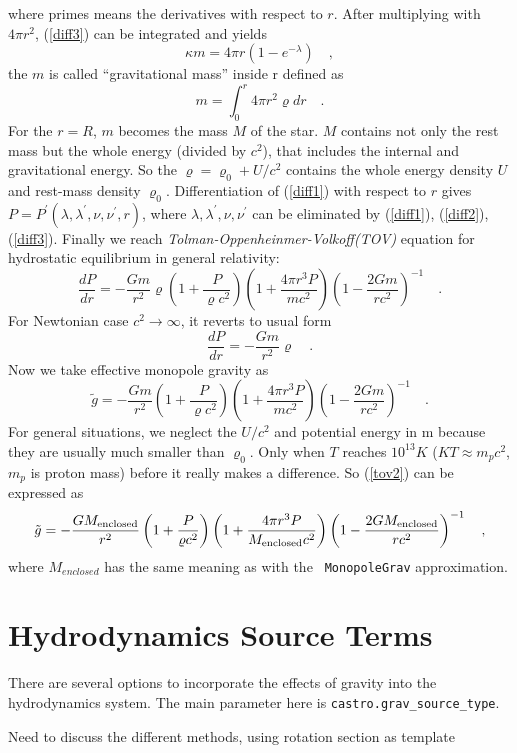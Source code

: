 where primes means the derivatives with respect to $r$. After
multiplying with $4\pi r^2$, (\ref{diff3}) can be integrated and
yields
\begin{equation}\label{gmass1}
  \kappa m = 4\pi r (1-e^{-\lambda}) \quad ,
\end{equation}
the $m$ is called ``gravitational mass'' inside r defined as
\begin{equation}\label{gmass2}
  m = \int_{0}^{r}4\pi r^{2}  \varrho dr\quad .
\end{equation}
For the $r = R$, $m$ becomes the mass $M$ of the star. $M$ contains
not only the rest mass but the whole energy (divided by $c^2$), that
includes the internal and gravitational energy. So the $\varrho =
\varrho_0 +U/c^2$ contains the whole energy density $U$ and rest-mass
density $\varrho_0$.  Differentiation of (\ref{diff1}) with respect to
$r$ gives $P = P^{\prime}(\lambda,\lambda^{\prime},
\nu,\nu^{\prime},r)$, where
$\lambda,\lambda^{\prime},\nu,\nu^{\prime}$ can be eliminated by
(\ref{diff1}), (\ref{diff2}), (\ref{diff3}). Finally we reach
\textit{Tolman-Oppenheinmer-Volkoff(TOV)} equation for hydrostatic
equilibrium in general relativity:
\begin{equation}\label{tov}
  \frac{dP}{dr} = -\frac{Gm}{r^{2}}\varrho \left (1+\frac{P}{\varrho
    c^{2}}\right )\left (1+\frac{4\pi r^3 P}{m c^{2}}\right ) \left (1-\frac{2Gm}{r c^{2}} \right)^{-1} \quad .
\end{equation}
For Newtonian case $c^2 \rightarrow  \infty $, it reverts to usual form
\begin{equation}\label{newton}
  \frac{dP}{dr} = -\frac{Gm}{r^{2}}\varrho \quad .
\end{equation}
Now we take effective monopole gravity as
\begin{equation}\label{tov2}
\tilde{g} = -\frac{Gm}{r^{2}} (1+\frac{P}{\varrho
  c^{2}})(1+\frac{4\pi r^3 P}{m c^{2}}) (1-\frac{2Gm}{r c^{2}})^{-1}  \quad .
\end{equation}
For general situations, we neglect the $U/c^2$ and potential energy in
m because they are usually much smaller than $\varrho_0$. Only when
$T$ reaches $10^{13} K$ ($KT \approx m_{p} c^2$, $m_p$ is proton mass)
before it really makes a difference. So (\ref{tov2}) can be expressed
as
\begin{equation}\label{tov3}
  \tilde{g} = -\frac{GM_{\rm enclosed}}{r^{2}} \left (1+\frac{P}{\varrho
    c^{2}} \right )\left (1+\frac{4\pi r^3 P}{M_{\rm enclosed} c^{2}} \right ) \left (1-\frac{2GM_{\rm enclosed}}{r c^{2}} \right )^{-1} \quad ,
\end{equation}
where $M_{enclosed}$ has the same meaning as with the {\tt
  MonopoleGrav} approximation.



\section{Hydrodynamics Source Terms}

There are several options to incorporate the effects of gravity into the 
hydrodynamics system.  The main parameter here is {\tt castro.grav\_source\_type}.

{\color{red} Need to discuss the different methods, using rotation section as template}
